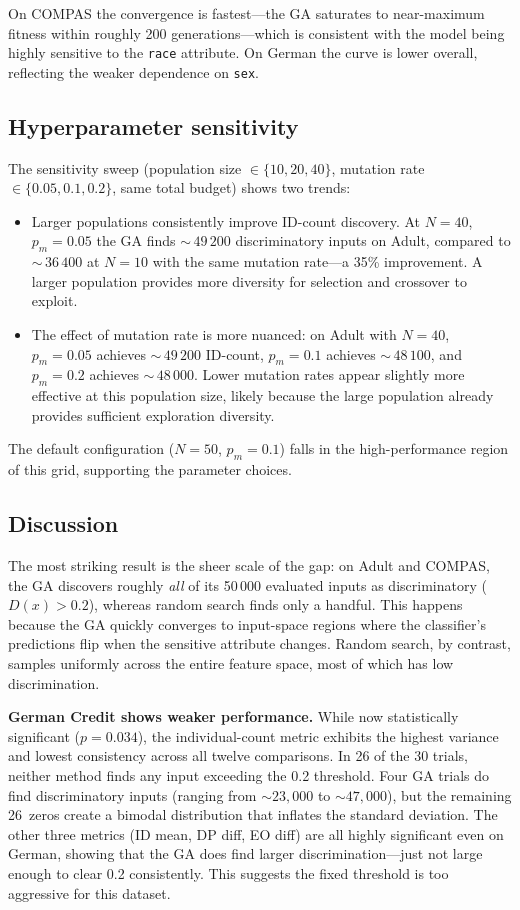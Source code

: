 \documentclass[10pt]{article}
\begin{document}
On COMPAS the convergence is fastest---the GA saturates to near-maximum fitness within
roughly 200 generations---which is consistent with the model being highly sensitive to
the \texttt{race} attribute.  On German the curve is lower overall, reflecting the
weaker dependence on \texttt{sex}.

\subsection{Hyperparameter sensitivity}
The sensitivity sweep (population size $\in \{10,20,40\}$, mutation rate
$\in \{0.05, 0.1, 0.2\}$, same total budget) shows two trends:
\begin{itemize}
    \item Larger populations consistently improve ID-count discovery.  At $N{=}40$,
          $p_m{=}0.05$ the GA finds ${\sim}\,49\,200$ discriminatory inputs on Adult,
          compared to ${\sim}\,36\,400$ at $N{=}10$ with the same mutation rate---a
          35\% improvement.  A larger population provides more diversity for selection
          and crossover to exploit.
    \item The effect of mutation rate is more nuanced: on Adult with $N{=}40$,
          $p_m{=}0.05$ achieves ${\sim}\,49\,200$ ID-count, $p_m{=}0.1$ achieves
          ${\sim}\,48\,100$, and $p_m{=}0.2$ achieves ${\sim}\,48\,000$.  Lower
          mutation rates appear slightly more effective at this population size,
          likely because the large population already provides sufficient exploration
          diversity.
\end{itemize}
The default configuration ($N{=}50$, $p_m{=}0.1$) falls in the high-performance region
of this grid, supporting the parameter choices.

\subsection{Discussion}

The most striking result is the sheer scale of the gap: on Adult and COMPAS, the GA
discovers roughly \emph{all} of its 50\,000 evaluated inputs as discriminatory
($D(x)>0.2$), whereas random search finds only a handful.  This happens because the GA
quickly converges to input-space regions where the classifier's predictions flip when the
sensitive attribute changes.  Random search, by contrast, samples uniformly across the
entire feature space, most of which has low discrimination.

\textbf{German Credit shows weaker performance.}  While now statistically significant
($p{=}0.034$), the individual-count metric exhibits the highest variance and lowest
consistency across all twelve comparisons.  In 26 of the 30 trials, neither method finds
any input exceeding the 0.2 threshold.  Four GA trials do find discriminatory inputs
(ranging from ${\sim}23{,}000$ to ${\sim}47{,}000$), but the remaining 26~zeros create
a bimodal distribution that inflates the standard deviation.  The other three metrics
(ID mean, DP diff, EO diff) are all highly significant even on German, showing that the
GA does find larger discrimination---just not large enough to clear 0.2 consistently.
This suggests the fixed threshold is too aggressive for this dataset.
\end{document}
